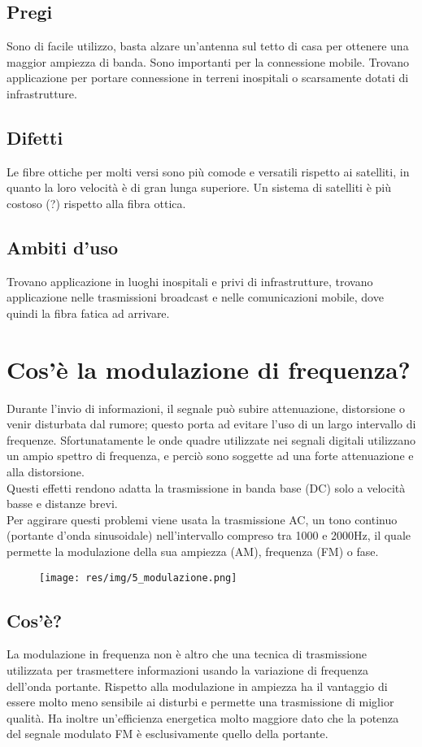 \subsection{Pregi}
Sono di facile utilizzo, basta alzare un'antenna sul tetto di casa per ottenere una maggior ampiezza di banda.
Sono importanti per la connessione mobile.
Trovano applicazione per portare connessione in terreni inospitali o scarsamente dotati di infrastrutture.

\subsection{Difetti}
Le fibre ottiche per molti versi sono più comode e versatili rispetto ai satelliti, in quanto la loro velocità è di gran lunga superiore.
Un sistema di satelliti è più costoso (?) rispetto alla fibra ottica.

\subsection{Ambiti d'uso}
Trovano applicazione in luoghi inospitali e privi di infrastrutture, trovano applicazione nelle trasmissioni broadcast e nelle comunicazioni mobile, dove quindi la fibra fatica ad arrivare.

\section{Cos'è la modulazione di frequenza?}

Durante l'invio di informazioni, il segnale può subire attenuazione, distorsione o venir disturbata dal rumore;
questo porta ad evitare l'uso di un largo intervallo di frequenze.
Sfortunatamente le onde quadre utilizzate nei segnali digitali utilizzano un ampio spettro di frequenza, e perciò sono soggette ad una forte attenuazione e alla distorsione.\\
Questi effetti rendono adatta la trasmissione in banda base (DC) solo a velocità basse e distanze brevi.\\
Per aggirare questi problemi viene usata la trasmissione AC, un tono continuo (portante d'onda sinusoidale) nell'intervallo compreso tra 1000 e 2000Hz,
il quale permette la modulazione della sua ampiezza (AM), frequenza (FM) o fase.

\begin{figure}[H]
\centering
\texttt{[image: res/img/5\_modulazione.png]}
\end{figure}
\subsection{Cos'è?}
La modulazione in frequenza non è altro che una tecnica di trasmissione utilizzata per trasmettere informazioni usando la variazione di frequenza dell'onda portante.
Rispetto alla modulazione in ampiezza ha il vantaggio di essere molto meno sensibile ai disturbi e permette una trasmissione di miglior qualità.
Ha inoltre un'efficienza energetica molto maggiore dato che la potenza del segnale modulato FM è esclusivamente quello della portante.

